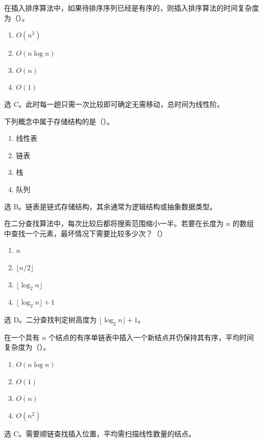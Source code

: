 \begin{question}
在插入排序算法中，如果待排序序列已经是有序的，则插入排序算法的时间复杂度为（\quad）。
\begin{enumerate}
  \item $O(n^2)$
  \item $O(n\log n)$
  \item $O(n)$
  \item $O(1)$
\end{enumerate}
\begin{solution}
选 C。此时每一趟只需一次比较即可确定无需移动，总时间为线性阶。
\end{solution}
\end{question}

\begin{question}
下列概念中属于存储结构的是（\quad）。
\begin{enumerate}
  \item 线性表
  \item 链表
  \item 栈
  \item 队列
\end{enumerate}
\begin{solution}
选 B。链表是链式存储结构，其余通常为逻辑结构或抽象数据类型。
\end{solution}
\end{question}

\begin{question}
在二分查找算法中，每次比较后都将搜索范围缩小一半。若要在长度为 $n$ 的数组中查找一个元素，最坏情况下需要比较多少次？（\quad）
\begin{enumerate}
  \item $n$
  \item $\lfloor n/2\rfloor$
  \item $\lfloor\log_2 n\rfloor$
  \item $\lfloor\log_2 n\rfloor+1$
\end{enumerate}
\begin{solution}
选 D。二分查找判定树高度为 $\lfloor\log_2 n\rfloor+1$。
\end{solution}
\end{question}

\begin{question}
在一个具有 $n$ 个结点的有序单链表中插入一个新结点并仍保持其有序，平均时间复杂度为（\quad）。
\begin{enumerate}
  \item $O(n\log n)$
  \item $O(1)$
  \item $O(n)$
  \item $O(n^2)$
\end{enumerate}
\begin{solution}
选 C。需要顺链查找插入位置，平均需扫描线性数量的结点。
\end{solution}
\end{question}

